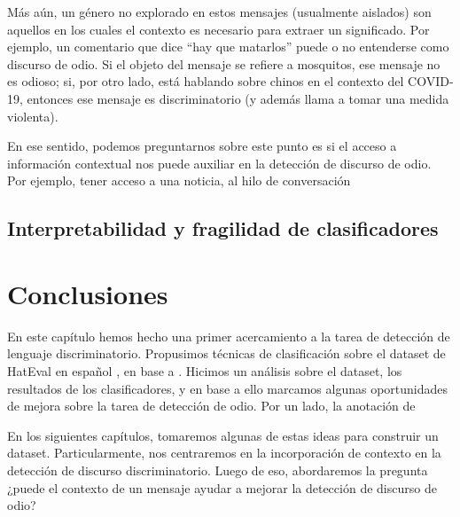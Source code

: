 Más aún, un género no explorado en estos mensajes (usualmente aislados) son aquellos en los cuales el contexto es necesario para extraer un significado. Por ejemplo, un comentario que dice ``hay que matarlos'' puede o no entenderse como discurso de odio. Si el objeto del mensaje se refiere a mosquitos, ese mensaje no es odioso; si, por otro lado, está hablando sobre chinos en el contexto del COVID-19, entonces ese mensaje es discriminatorio (y además llama a tomar una medida violenta).

En ese sentido, podemos preguntarnos sobre este punto es si el acceso a información contextual nos puede auxiliar en la detección de discurso de odio. Por ejemplo, tener acceso a una noticia, al hilo de conversación


\subsection{Interpretabilidad y fragilidad de clasificadores}



\section{Conclusiones}

En este capítulo hemos hecho una primer acercamiento a la tarea de detección de lenguaje discriminatorio. Propusimos técnicas de clasificación sobre el dataset de HatEval en español \cite{hateval2019semeval}, en base a \citet{atalaya_tass2018}. Hicimos un análisis sobre el dataset, los resultados de los clasificadores, y en base a ello marcamos algunas oportunidades de mejora sobre la tarea de detección de odio. Por un lado, la anotación de

En los siguientes capítulos, tomaremos algunas de estas ideas para construir un dataset. Particularmente, nos centraremos en la incorporación de contexto en la detección de discurso discriminatorio. Luego de eso, abordaremos la pregunta ¿puede el contexto de un mensaje ayudar a mejorar la detección de discurso de odio?